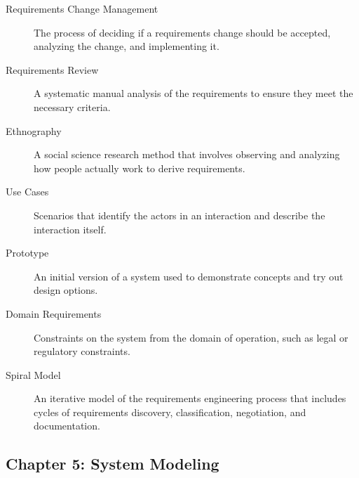\documentclass{article}
\begin{document}
\begin{description}
  \item[Requirements Change Management] The process of deciding if a requirements change should be accepted, analyzing the change, and implementing it.
  
  \item[Requirements Review] A systematic manual analysis of the requirements to ensure they meet the necessary criteria.
  
  \item[Ethnography] A social science research method that involves observing and analyzing how people actually work to derive requirements.
  
  \item[Use Cases] Scenarios that identify the actors in an interaction and describe the interaction itself.
  
  \item[Prototype] An initial version of a system used to demonstrate concepts and try out design options.
  
  \item[Domain Requirements] Constraints on the system from the domain of operation, such as legal or regulatory constraints.
  
  \item[Spiral Model] An iterative model of the requirements engineering process that includes cycles of requirements discovery, classification, negotiation, and documentation.
\end{description}

\subsection{Chapter 5: System Modeling}
\end{document}
